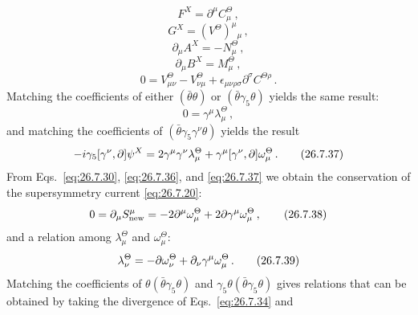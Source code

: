\begin{equation}
  F^X=\partial^\mu C_\mu^\Theta\,,
  \tag{26.7.31}\label{eq:26.7.31}
\end{equation}
\begin{equation}
  G^X=(V^\Theta)^\mu{}_\mu\,,
  \tag{26.7.32}\label{eq:26.7.32}
\end{equation}
\begin{equation}
  \partial_\mu A^X=-N_\mu^\Theta\,,
  \tag{26.7.33}\label{eq:26.7.33}
\end{equation}
\begin{equation}
  \partial_\mu B^X=M_\mu^\Theta\,,
  \tag{26.7.34}\label{eq:26.7.34}
\end{equation}
\begin{equation}
  0=V_{\mu\nu}^\Theta-V_{\nu\mu}^\Theta
    +\epsilon_{\mu\nu\rho\sigma}\partial^\sigma C^{\Theta\rho}\,.
  \tag{26.7.35}\label{eq:26.7.35}
\end{equation}
Matching the coefficients of either \((\bar\theta\theta)\) or
\((\bar\theta\gamma_5\theta)\) yields the same result:
\begin{equation}
  0=\gamma^\mu\lambda_\mu^\Theta\,,
  \tag{26.7.36}\label{eq:26.7.36}
\end{equation}
and matching the coefficients of
\((\bar\theta\gamma_5\gamma^\nu\theta)\) yields the result
\begin{equation}
  -i\gamma_5[\gamma^\nu,\sl{\partial}]\psi^X
  =2\gamma^\mu\gamma^\nu\lambda_\mu^\Theta
   +\gamma^\mu[\gamma^\nu,\sl{\partial}]\omega_\mu^\Theta\,.
  \tag{26.7.37}\label{eq:26.7.37}
\end{equation}
From Eqs.~\eqref{eq:26.7.30}, \eqref{eq:26.7.36}, and
\eqref{eq:26.7.37} we obtain the conservation of the supersymmetry current
\eqref{eq:26.7.20}:
\begin{equation}
  0=\partial_\mu S_{\mathrm{new}}^\mu
  =-2\partial^\mu\omega_\mu^\Theta
   +2\sl{\partial}\gamma^\mu\omega_\mu^\Theta\,,
  \tag{26.7.38}\label{eq:26.7.38}
\end{equation}
and a relation among \(\lambda_\mu^\Theta\) and \(\omega_\mu^\Theta\):
\begin{equation}
  \lambda_\nu^\Theta
  =-\sl{\partial}\omega_\nu^\Theta
   +\partial_\nu\gamma^\mu\omega_\mu^\Theta\,.
  \tag{26.7.39}\label{eq:26.7.39}
\end{equation}
Matching the coefficients of
\(\theta(\bar\theta\gamma_5\theta)\) and
\(\gamma_5\theta(\bar\theta\gamma_5\theta)\) gives relations that can be
obtained by taking the divergence of Eqs.~\eqref{eq:26.7.34} and
